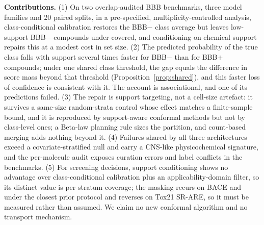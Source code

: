 \documentclass[10pt]{article}
\begin{document}
\textbf{Contributions.} (1) On two overlap-audited BBB benchmarks, three model families and 20 paired splits, in a pre-specified, multiplicity-controlled analysis, class-conditional calibration restores the BBB$-$ class average but leaves low-support BBB$-$ compounds under-covered, and conditioning on chemical support repairs this at a modest cost in set size. (2) The predicted probability of the true class falls with support several times faster for BBB$-$ than for BBB$+$ compounds; under one shared class threshold, the gap equals the difference in score mass beyond that threshold (Proposition~\ref{prop:shared}), and this faster loss of confidence is consistent with it. The account is associational, and one of its predictions failed. (3) The repair is support targeting, not a cell-size artefact: it survives a same-size random-strata control whose effect matches a finite-sample bound, and it is reproduced by support-aware conformal methods but not by class-level ones; a Beta-law planning rule sizes the partition, and count-based merging adds nothing beyond it. (4) Failures shared by all three architectures exceed a covariate-stratified null and carry a CNS-like physicochemical signature, and the per-molecule audit exposes curation errors and label conflicts in the benchmarks. (5) For screening decisions, support conditioning shows no advantage over class-conditional calibration plus an applicability-domain filter, so its distinct value is per-stratum coverage; the masking recurs on BACE and under the closest prior protocol and reverses on Tox21 SR-ARE, so it must be measured rather than assumed. We claim no new conformal algorithm and no transport mechanism.
\end{document}
